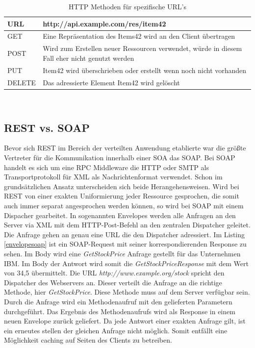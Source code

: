 \documentclass[fleqn,10pt,ngerman]{SelfArx}
\begin{document}
\begin{table}[hbt]
	\caption{HTTP Methoden für spezifische URL's}
	\centering
	\begin{tabular}{ |p{2cm}|p{5.5cm}|}
		\toprule
		\cmidrule(r){1-2}
		URL & \textbf{http://api.example.com/res/item42}\\
		\midrule
		GET & Eine Repräsentation des Items42 wird an den Client übertragen\\
		\midrule
		POST & Wird zum Erstellen neuer Ressourcen verwendet, würde in diesem Fall eher nicht genutzt werden\\
		\midrule
		PUT & Item42 wird überschrieben oder erstellt wenn noch nicht vorhanden\\
		\midrule
		DELETE & Das adressierte Element Item42 wird gelöscht\\
		\bottomrule
	\end{tabular}\\
	\label{tab:httptable}
\end{table}

\subsection{REST vs. SOAP}
Bevor sich REST im Bereich der verteilten Anwendung etablierte war die größte Vertreter für die Kommunikation innerhalb einer SOA das SOAP. Bei SOAP handelt es sich um eine RPC Middleware die HTTP oder SMTP als Transportprotokoll für XML als Nachrichtenformat verwendet. Schon im grundsätzlichen Ansatz unterscheiden sich beide Herangehensweisen. Wird bei REST von einer exakten Uniformierung jeder Ressource gesprochen, die somit auch immer separat angesprochen werden können, so wird bei SOAP mit einem Dispacher gearbeitet. In sogenannten Envelopes werden alle Anfragen an den Server via XML mit dem HTTP-Post-Befehl an den zentralen Dispatcher geleitet. Die Anfrage gehen an genau eine URL die den Dispatcher adressiert. Im Listing \ref{envelopesoap} ist ein SOAP-Request mit seiner korrespondierenden Response zu sehen. Im Body wird eine \textit{GetStockPrice} Anfrage gestellt für das Unternehmen IBM. Im Body der Antwort wird somit die \textit{GetStockPriceResponse} mit dem Wert von 34,5 übermittelt. Die URL \textit{http://www.example.org/stock} spricht den Dispatcher des Webservers an. Dieser verteilt die Anfrage an die richtige Methode, hier \textit{GetStockPrice}. Diese Methode muss auf dem Server verfügbar sein. Durch die Anfrage wird ein Methodenaufruf mit den gelieferten Parametern durchgeführt. Das Ergebnis des Methodenaufrufs wird als Response in einem neuen Envelope zurück geliefert. Da jede Antwort einer exakten Anfrage gilt, ist ein erneutes stellen der gleichen Anfrage nicht möglich. Somit entfällt eine Möglichkeit caching auf Seiten des Clients zu betreiben.
\end{document}
